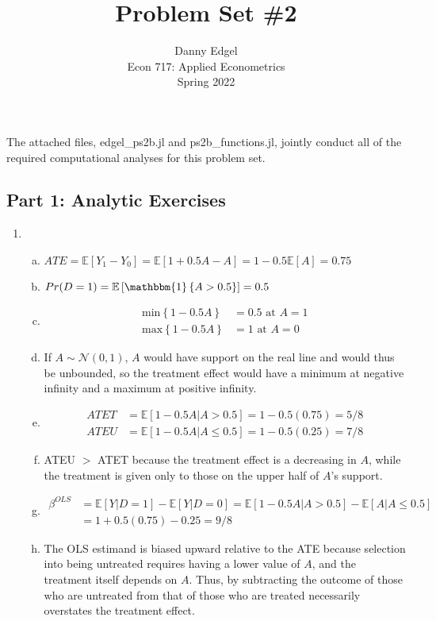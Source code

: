 \documentclass{article}
\newcommand{\N}{\mathcal{N}}
\newcommand{\one}[1]{\mathbbm{1}\left\{#1\right\}}
\newcommand{\E}[1]{\mathbb{E}\left[#1\right]}%
\begin{document}
\title{	Problem Set \#2 }
\author{ 	Danny Edgel 			\\ 
		    Econ 717: Applied Econometrics	\\
		    Spring 2022						
		}
\maketitle\thispagestyle{empty}


\noindent The attached files, edgel\_ps2b.jl and ps2b\_functions.jl, jointly conduct all of the required computational analyses for this problem set.

\subsection*{Part 1: Analytic Exercises}
\begin{enumerate}[1)]
    \item 
    \begin{enumerate}[a)]
            \item $ATE = \E{Y_1 - Y_0} = \E{1 + 0.5A - A} = 1-0.5\E{A} = 0.75$
            \item $Pr(D=1) = \E{\one{A>0.5}} = 0.5$
            \item \begin{align*}
                \text{min}\left\{1 - 0.5A\right\} &= 0.5 \text{ at }A=1 \\
                \text{max}\left\{1 - 0.5A\right\} &= 1   \text{ at }A=0
                \end{align*}
            \item If $A\sim\N(0,1)$, $A$ would have support on the real line and would thus be unbounded, so the treatment effect would have a minimum at negative infinity and a maximum at positive infinity.
            \item \begin{align*}
                ATET &= \E{1-0.5A|A>0.5} = 1-0.5(0.75) = 5/8  \\
                ATEU &= \E{1-0.5A|A\leq 0.5} = 1-0.5(0.25) = 7/8  
            \end{align*}
            \item ATEU $>$ ATET because the treatment effect is a decreasing in $A$, while the treatment is given only to those on the upper half of $A$'s support.
            \item \begin{align*} 
                \beta^{OLS} &= \E{Y|D=1} - \E{Y|D=0} = \E{1-0.5A|A>0.5} - \E{A|A\leq 0.5}       \\
                        &= 1 + 0.5(0.75) - 0.25 = 9/8
            \end{align*}
            \item The OLS estimand is biased upward relative to the ATE because selection into being untreated requires having a lower value of $A$, and the treatment itself depends on $A$. Thus, by subtracting the outcome of those who are untreated from that of those who are treated necessarily overstates the treatment effect.
    \end{enumerate}
\end{enumerate}
\end{document}
